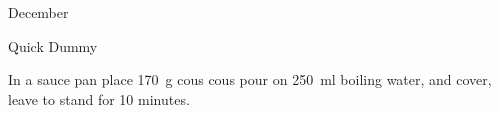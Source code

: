 \begin{menu}{December}
\begin{recipe}{1}{Quick Dummy}
\begin{ingredients}
		\end{ingredients}
	
	
    \begin{instructions}
    \item 
    In a
    sauce pan 
    place
    170~g  cous cous
    pour on
    250~ml  boiling water,
    and cover, leave to stand for 10 minutes.
  
    \end{instructions}
    \end{recipe}%
  
    \clearpage
    \end{menu}
	
	